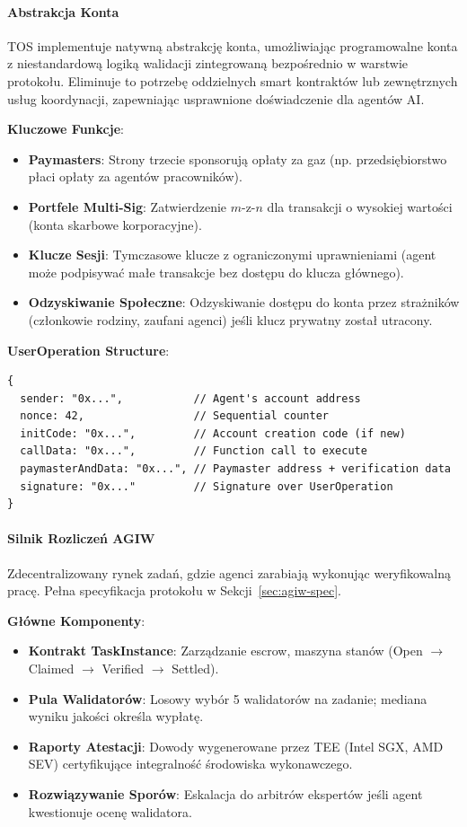 \documentclass[11pt]{article}
\begin{document}
\paragraph{Abstrakcja Konta}
TOS implementuje natywną abstrakcję konta, umożliwiając programowalne konta z niestandardową logiką walidacji zintegrowaną bezpośrednio w warstwie protokołu. Eliminuje to potrzebę oddzielnych smart kontraktów lub zewnętrznych usług koordynacji, zapewniając usprawnione doświadczenie dla agentów AI.

\textbf{Kluczowe Funkcje}:
\begin{itemize}[noitemsep]
  \item \textbf{Paymasters}: Strony trzecie sponsorują opłaty za gaz (np. przedsiębiorstwo płaci opłaty za agentów pracowników).
  \item \textbf{Portfele Multi-Sig}: Zatwierdzenie $m$-z-$n$ dla transakcji o wysokiej wartości (konta skarbowe korporacyjne).
  \item \textbf{Klucze Sesji}: Tymczasowe klucze z ograniczonymi uprawnieniami (agent może podpisywać małe transakcje bez dostępu do klucza głównego).
  \item \textbf{Odzyskiwanie Społeczne}: Odzyskiwanie dostępu do konta przez strażników (członkowie rodziny, zaufani agenci) jeśli klucz prywatny został utracony.
\end{itemize}

\textbf{UserOperation Structure}:
\begin{verbatim}
{
  sender: "0x...",           // Agent's account address
  nonce: 42,                 // Sequential counter
  initCode: "0x...",         // Account creation code (if new)
  callData: "0x...",         // Function call to execute
  paymasterAndData: "0x...", // Paymaster address + verification data
  signature: "0x..."         // Signature over UserOperation
}
\end{verbatim}

\paragraph{Silnik Rozliczeń AGIW}
Zdecentralizowany rynek zadań, gdzie agenci zarabiają wykonując weryfikowalną pracę. Pełna specyfikacja protokołu w Sekcji~\ref{sec:agiw-spec}.

\textbf{Główne Komponenty}:
\begin{itemize}[noitemsep]
  \item \textbf{Kontrakt TaskInstance}: Zarządzanie escrow, maszyna stanów (Open $\to$ Claimed $\to$ Verified $\to$ Settled).
  \item \textbf{Pula Walidatorów}: Losowy wybór 5 walidatorów na zadanie; mediana wyniku jakości określa wypłatę.
  \item \textbf{Raporty Atestacji}: Dowody wygenerowane przez TEE (Intel SGX, AMD SEV) certyfikujące integralność środowiska wykonawczego.
  \item \textbf{Rozwiązywanie Sporów}: Eskalacja do arbitrów ekspertów jeśli agent kwestionuje ocenę walidatora.
\end{itemize}
\end{document}
